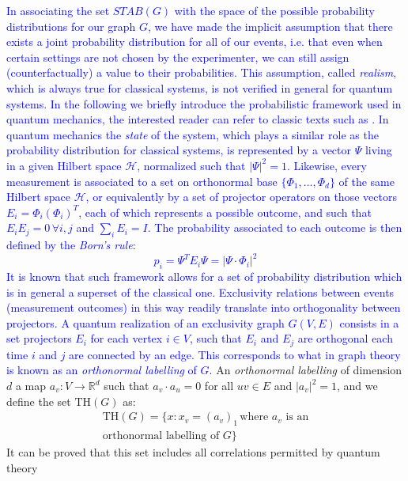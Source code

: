 \documentclass[letterpaper]{article}
\newcommand{\abs}[1]{\left|#1\right|}
\newcommand{\Real}{\mathbb{R}}
\renewcommand{\TH}{\mathrm{TH}}
\begin{document}
\textcolor{blue}{
In associating the set $STAB(G)$ with the space of the possible
probability distributions for our graph $G$, we have made the implicit
assumption that there exists a joint probability distribution for all
of our events, i.e. that even when certain settings are not chosen by
the experimenter, we can still assign (counterfactually) a value to
their probabilities.
This assumption, called \emph{realism}, which is always true for
classical systems, is not verified in general for quantum systems.
In the following we briefly introduce the probabilistic framework used
in quantum mechanics, the interested reader can refer to classic texts
such as \cite{nielsen_chuang}.
In quantum mechanics the \emph{state} of the system, which plays a
similar role as the probability distribution for classical systems,
is represented by a  vector $\Psi$ living in a given Hilbert space
$\mathcal{H}$, normalized such that $\abs{\Psi}^2 = 1$.
Likewise, every measurement is associated to a set on orthonormal base
$\{\Phi_1,\ldots,\Phi_d\}$ of the same Hilbert space $\mathcal{H}$, 
or equivalently by a set of projector operators on those vectors 
$E_i = \Phi_i (\Phi_i)^T$, each of which represents a possible outcome, 
and such that $E_i E_j = 0 \, \forall i,j$ and $\sum_i E_i = I$.
The probability associated to each outcome is then defined by the \emph{Born's rule}:
\begin{equation}
    p_i = \Psi^T E_i \Psi = \abs{\Psi \cdot \Phi_i}^2
\end{equation}
It is known that such framework allows for a set of probability distribution which
is in general a superset of the classical one.
}
\textcolor{blue}{
Exclusivity relations between events (measurement outcomes) in this way
readily translate into orthogonality between projectors.
A quantum realization of an exclusivity graph $G(V,E)$ consists in 
a set projectors $E_i$ for each vertex $i \in V$, such that $E_i$ and $E_j$ are
orthogonal each time $i$ and $j$ are connected by an edge.
This corresponds to what in graph theory is known as an \emph{orthonormal labelling} of $G$. 
}
An \emph{orthonormal labelling} of dimension $d$ a map
$a_v:V \rightarrow \Real^d$ such that $a_v \cdot a_u = 0$ for all $uv \in E$ and
$|a_v|^2 = 1$, and we define the set $\TH(G)$ as:
\begin{multline}
    \TH(G) = \{x: x_v = (a_v)_1 \, \text{where $a_v$ is an} \\ \text{orthonormal labelling of $G$}\}
    \label{eq:thbody}
\end{multline}
It can be proved that this set includes all correlations permitted by quantum theory 
\end{document}
